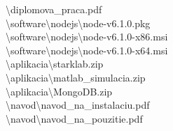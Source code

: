 \noindent \textbackslash diplomova\_praca.pdf\\
\textbackslash software\textbackslash{nodejs}\textbackslash{node-v6.1.0.pkg}\\
\textbackslash software\textbackslash{nodejs}\textbackslash{node-v6.1.0-x86.msi}\\
\textbackslash software\textbackslash{nodejs}\textbackslash{node-v6.1.0-x64.msi}\\
\textbackslash aplikacia\textbackslash{starklab.zip}\\
\textbackslash aplikacia\textbackslash{matlab\_simulacia.zip}\\
\textbackslash aplikacia\textbackslash{MongoDB.zip}\\
\textbackslash navod\textbackslash{navod\_na\_instalaciu.pdf}\\
\textbackslash navod\textbackslash{navod\_na\_pouzitie.pdf}\\